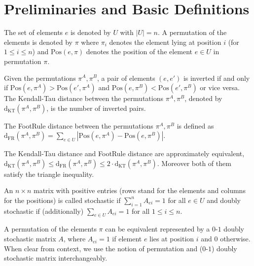 \documentclass[a4paper,UKenglish,cleveref,autoref, thm-restate]{lipics-v2019}
\def\dkt{\mathrm{d}_{\mathrm{KT}}}
\begin{document}
\maketitle

\label{sec:typesetting-summary}




\section{Preliminaries and Basic Definitions}
The set of elements $e$ is denoted by $U$ with $|U| = n$. A permutation of the elements is denoted by $\pi$ where $\pi_i$ denotes the element lying at position $i$ (for $1\leq i \leq n$) and $\mathrm{Pos}(e,\pi)$ denotes the position of the element $e \in U$ in permutation $\pi$.

\begin{definition}\label{d:KT}
Given the permutations $\pi^A,\pi^B$, a pair of elements $(e,e')$ is inverted if and only if $\mathrm{Pos}(e,\pi^A) > \mathrm{Pos}(e',\pi^A)$ and $\mathrm{Pos}(e,\pi^B) < \mathrm{Pos}(e',\pi^B)$ or vice versa. The Kendall-Tau distance between the permutations $\pi^A,\pi^B$, denoted by $\dkt(\pi^A,\pi^B)$, is the number of inverted pairs.
\end{definition}

\begin{definition}\label{d:KT}
The FootRule distance between the permutations $\pi^A,\pi^B$ is defined as $\mathrm{d}_{\mathrm{FR}}(\pi^A,\pi^B) = \sum_{e \in U}|\mathrm{Pos}(e,\pi^A) - \mathrm{Pos}(e,\pi^B)|$.
\end{definition}
\noindent The Kendall-Tau distance and FootRule distance are approximately equivalent, $\dkt(\pi^A,\pi^B) \leq \mathrm{d}_{\mathrm{FR}}(\pi^A,\pi^B) \leq 2 \cdot \dkt(\pi^A,\pi^B)$. Moreover both of them satisfy the triangle inequality.
\begin{definition} An $n \times n$ matrix with positive entries (rows stand for the elements and columns for the positions) is called stochastic if $\sum_{i = 1}^n A_{ei} = 1$ for all $e\in U$ and doubly stochastic if (additionally) $\sum_{e \in U} A_{ei}=1$ for all $1\leq i \leq n$.
\end{definition}
\noindent A permutation of the elements $\pi$ can be equivalent represented by a $0$-$1$ doubly stochastic matrix $A$, where $A_{ei}=1$ if element $e$ lies at position $i$ and $0$ otherwise. When clear from context, we use the notion of permutation and ($0$-$1$) doubly stochastic matrix interchangeably.
\end{document}
